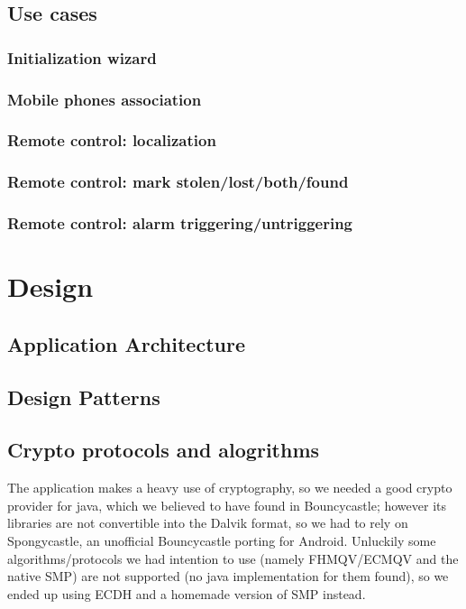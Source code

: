 \documentclass[a4paper,12pt]{article}
\begin{document}
\subsection{Use cases}
\subsubsection{Initialization wizard}
\subsubsection{Mobile phones association}
\subsubsection{Remote control: localization}
\subsubsection{Remote control: mark stolen/lost/both/found}
\subsubsection{Remote control: alarm triggering/untriggering}
\clearpage

\noindent	
\Huge{\section{Design}}
\subsection{Application Architecture}
\subsection{Design Patterns}
\subsection{Crypto protocols and alogrithms}
\small{The application makes a heavy use of cryptography, so we needed a good crypto provider for java, which we believed to have found in Bouncycastle; however its libraries are not convertible into the Dalvik format, so we had to rely on Spongycastle, an unofficial Bouncycastle porting for Android. Unluckily some algorithms/protocols we had intention to use (namely FHMQV/ECMQV and the native SMP) are not supported (no java implementation for them found), so we ended up using ECDH and a homemade version of SMP instead.}
\end{document}
